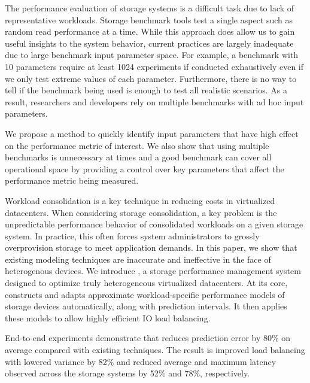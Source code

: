 The performance evaluation of storage systems is a difficult task due to lack of representative workloads. Storage benchmark tools test a single aspect such as random read performance at a time. While this approach does allow us to gain useful insights to the system behavior, current practices are largely inadequate due to large benchmark input parameter space. For example, a benchmark with 10 parameters require at least 1024 experiments if conducted exhaustively even if we only test extreme values of each parameter. Furthermore, there is no way to tell if the benchmark being used is enough to test all realistic scenarios. As a result, researchers and developers rely on multiple benchmarks with ad hoc input parameters.

We propose a method to quickly identify input parameters that have high effect on the performance metric of interest. We also show that using multiple benchmarks is unnecessary at times and a good benchmark can cover all operational space by providing a control over key parameters that affect the performance metric being measured. 

Workload consolidation is a key technique in reducing costs in virtualized datacenters.
When considering storage consolidation, a key problem is the unpredictable performance behavior of consolidated workloads on a given storage system.
In practice, this often forces system administrators to grossly overprovision storage to meet application demands.
In this paper, we show that existing modeling techniques are inaccurate and ineffective in the face of heterogenous devices.
We introduce {\em\romano}, a storage performance management system designed to optimize truly heterogeneous virtualized datacenters.
At its core, \romano constructs and adapts approximate workload-specific performance models of storage devices automatically, along with prediction intervals.
It then applies these models to allow highly efficient IO load balancing.

End-to-end experiments demonstrate that \romano reduces prediction error by 80\% on average compared with existing techniques.
The result is improved load balancing with lowered variance by 82\% and reduced average and maximum latency observed across the storage systems by 52\% and 78\%, respectively.

